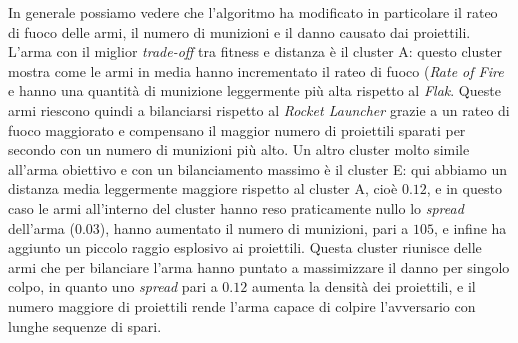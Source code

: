 \documentclass[12pt, italian]{toptesi}
\begin{document}
In generale possiamo vedere che l'algoritmo ha modificato in particolare il rateo di fuoco delle armi, il numero di munizioni e il danno causato dai proiettili.
L'arma con il miglior \emph{trade-off} tra fitness e distanza è il cluster A: questo cluster mostra come le armi in media hanno incrementato il rateo di fuoco (\emph{Rate of Fire} e hanno una quantità di munizione leggermente più alta rispetto al \emph{Flak}. Queste armi riescono quindi a bilanciarsi rispetto al \emph{Rocket Launcher} grazie a un rateo di fuoco maggiorato e compensano il maggior numero di proiettili sparati per secondo con un numero di munizioni più alto.
Un altro cluster molto simile all'arma obiettivo e con un bilanciamento massimo è il cluster E: qui abbiamo un distanza media leggermente maggiore rispetto al cluster A, cioè $0.12$, e in questo caso le armi all'interno del cluster hanno reso praticamente nullo lo \emph{spread} dell'arma ($0.03$), hanno aumentato il numero di munizioni, pari a $105$, e infine ha aggiunto un piccolo raggio esplosivo ai proiettili.
Questa cluster riunisce delle armi che per bilanciare l'arma hanno puntato a massimizzare il danno per singolo colpo, in quanto uno \emph{spread} pari a $0.12$ aumenta la densità dei proiettili, e il numero maggiore di proiettili rende l'arma capace di colpire l'avversario con lunghe sequenze di spari.
\end{document}

